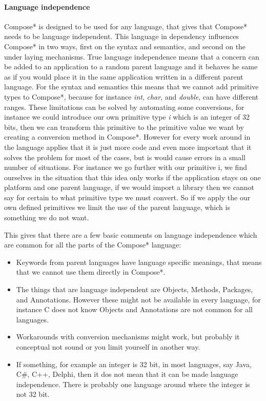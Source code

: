 \paragraph{Language independence} Compose* is designed to be used for any language, that gives that Compose*
needs to be language independent. This language in dependency influences Compose* in two ways, first on the
syntax and semantics, and second on the under laying mechanisms. True language independence means that a concern can be added to
an application to a random parent language and it behaves he same as if you would place it in the same application
written in a different parent language. For the syntax and semantics this means that we cannot add primitive types to
Compose*, because for instance \emph{int}, \emph{char}, and \emph{double}, can have different ranges.
These limitations can be solved by
automating some conversions, for instance we could introduce our own primitive type \emph{i} which is an integer
of 32 bits, then we can transform this primitive to the primitive value we want by creating a conversion method in
Compose*. However for every work around in the language applies that it is just more code and even more important
that it solves the problem for most of the cases, but is would cause errors in a small number of situations.
For instance we go further with our primitive i, we find ourselves in the situation that this idea only works if the
application stays on one platform and one parent language, if we would import a library then we cannot say for certain
to what primitive type we must convert. So if we apply the our own defined primitives we limit the use of the parent language,
which is something we do not want.

This gives that there are a few basic comments on language independence which are common for all the parts of the
Compose* language:

\begin{itemize}[noitemsep]
\item Keywords from parent languages have language specific meanings, that means that we cannot use them
directly in Compose*.
\item The things that are language independent are Objects, Methods, Packages, and Annotations. However these
might not be available in every language, for instance C does not know Objects and Annotations are not common for all
languages.
\item Workarounds with conversion mechanisms might work, but probably it conceptual not sound or you limit
yourself in another way.
\item If something, for example an integer is 32 bit, in most languages, say Java, C\#, C++, Delphi, then it dos not mean
that it can be made language independence. There is probably one language around where the integer is not 32 bit.
\end{itemize}

